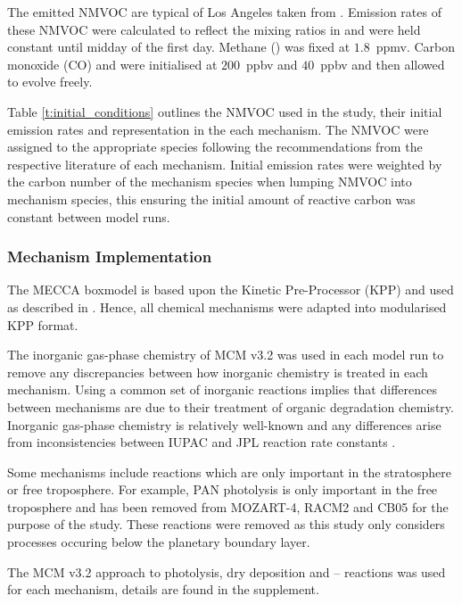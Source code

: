 The emitted NMVOC are typical of Los Angeles taken from \citet{Baker:2008}. 
Emission rates of these NMVOC were calculated to reflect the mixing ratios in \citet{Baker:2008} and were held constant until midday of the first day.
Methane () was fixed at \mbox{$1.8$ ppmv}. 
Carbon monoxide (CO) and  were initialised at \mbox{$200$ ppbv} and \mbox{$40$ ppbv} and then allowed to evolve freely.

Table \ref{t:initial_conditions} outlines the NMVOC used in the study, their initial emission rates and representation in the each mechanism.
The NMVOC were assigned to the appropriate species following the recommendations from the respective literature of each mechanism.
Initial emission rates were weighted by the carbon number of the mechanism species when lumping NMVOC into mechanism species, this ensuring the initial amount of reactive carbon was constant between model runs.

\subsubsection{Mechanism Implementation} %

The MECCA boxmodel \citep{Sander:2005} is based upon the Kinetic Pre-Processor (KPP) \citep{Damian:2002} and used as described in \citet{Butler:2011}. 
Hence, all chemical mechanisms were adapted into modularised KPP format.

The inorganic gas-phase chemistry of MCM v3.2 was used in each model run to remove any discrepancies between how inorganic chemistry is treated in each mechanism.
Using a common set of inorganic reactions implies that differences between mechanisms are due to their treatment of organic degradation chemistry.
Inorganic gas-phase chemistry is relatively well-known and any differences arise from inconsistencies between IUPAC and JPL reaction rate constants \citep{Emmerson:2009}.

Some mechanisms include reactions which are only important in the stratosphere or free troposphere.
For example, PAN photolysis is only important in the free troposphere \citep{Harwood:2003} and has been removed from MOZART-4, RACM2 and CB05 for the purpose of the study. 
These reactions were removed as this study only considers processes occuring below the planetary boundary layer.

The MCM v3.2 approach to photolysis, dry deposition and -- reactions was used for each mechanism, details are found in the supplement.

